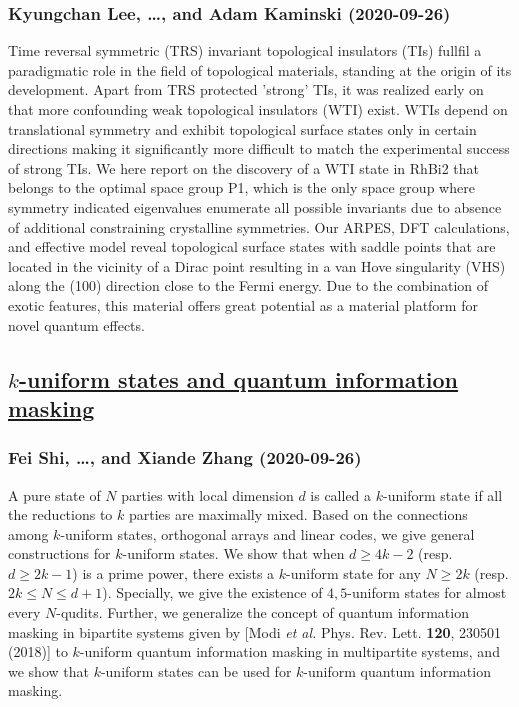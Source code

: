 \subsubsection*{Kyungchan Lee, \dots, and Adam Kaminski (2020-09-26)}
Time reversal symmetric (TRS) invariant topological insulators (TIs) fullfil
a paradigmatic role in the field of topological materials, standing at the
origin of its development. Apart from TRS protected 'strong' TIs, it was
realized early on that more confounding weak topological insulators (WTI)
exist. WTIs depend on translational symmetry and exhibit topological surface
states only in certain directions making it significantly more difficult to
match the experimental success of strong TIs. We here report on the discovery
of a WTI state in RhBi2 that belongs to the optimal space group P1, which is
the only space group where symmetry indicated eigenvalues enumerate all
possible invariants due to absence of additional constraining crystalline
symmetries. Our ARPES, DFT calculations, and effective model reveal topological
surface states with saddle points that are located in the vicinity of a Dirac
point resulting in a van Hove singularity (VHS) along the (100) direction close
to the Fermi energy. Due to the combination of exotic features, this material
offers great potential as a material platform for novel quantum effects.

\subsection*{\href{http://arxiv.org/abs/2009.12497v1}{$k$-uniform states and quantum information masking}}
\subsubsection*{Fei Shi, \dots, and Xiande Zhang (2020-09-26)}
A pure state of $N$ parties with local dimension $d$ is called a $k$-uniform
state if all the reductions to $k$ parties are maximally mixed. Based on the
connections among $k$-uniform states, orthogonal arrays and linear codes, we
give general constructions for $k$-uniform states. We show that when $d\geq
4k-2$ (resp. $d\geq 2k-1$) is a prime power, there exists a $k$-uniform state
for any $N\geq 2k$ (resp. $2k\leq N\leq d+1$). Specially, we give the existence
of $4,5$-uniform states for almost every $N$-qudits. Further, we generalize the
concept of quantum information masking in bipartite systems given by [Modi
\emph{et al.} Phys. Rev. Lett. \textbf{120}, 230501 (2018)] to $k$-uniform
quantum information masking in multipartite systems, and we show that
$k$-uniform states can be used for $k$-uniform quantum information masking.

